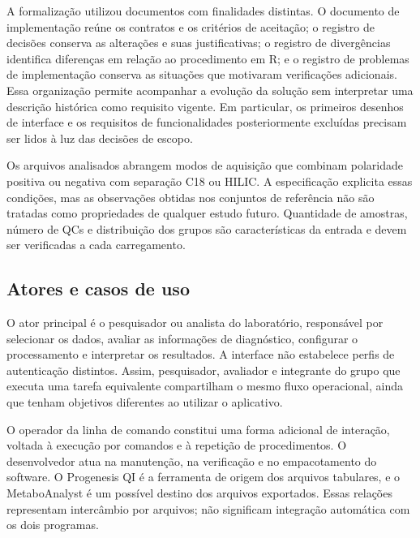 A formalização utilizou documentos com finalidades distintas. O documento de implementação reúne os contratos e os critérios de aceitação; o registro de decisões conserva as alterações e suas justificativas; o registro de divergências identifica diferenças em relação ao procedimento em R; e o registro de problemas de implementação conserva as situações que motivaram verificações adicionais. Essa organização permite acompanhar a evolução da solução sem interpretar uma descrição histórica como requisito vigente. Em particular, os primeiros desenhos de interface e os requisitos de funcionalidades posteriormente excluídas precisam ser lidos à luz das decisões de escopo.

Os arquivos analisados abrangem modos de aquisição que combinam polaridade positiva ou negativa com separação C18 ou HILIC. A especificação explicita essas condições, mas as observações obtidas nos conjuntos de referência não são tratadas como propriedades de qualquer estudo futuro. Quantidade de amostras, número de QCs e distribuição dos grupos são características da entrada e devem ser verificadas a cada carregamento.

\subsection{Atores e casos de uso}

O ator principal é o pesquisador ou analista do laboratório, responsável por selecionar os dados, avaliar as informações de diagnóstico, configurar o processamento e interpretar os resultados. A interface não estabelece perfis de autenticação distintos. Assim, pesquisador, avaliador e integrante do grupo que executa uma tarefa equivalente compartilham o mesmo fluxo operacional, ainda que tenham objetivos diferentes ao utilizar o aplicativo.

O operador da linha de comando constitui uma forma adicional de interação, voltada à execução por comandos e à repetição de procedimentos. O desenvolvedor atua na manutenção, na verificação e no empacotamento do software. O Progenesis QI é a ferramenta de origem dos arquivos tabulares, e o MetaboAnalyst é um possível destino dos arquivos exportados. Essas relações representam intercâmbio por arquivos; não significam integração automática com os dois programas.


